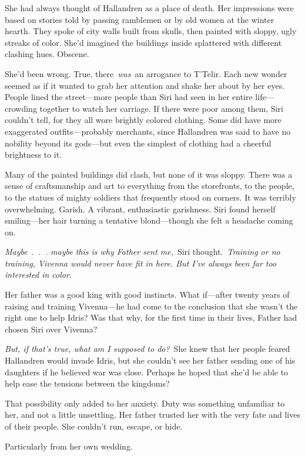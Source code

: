 She had always thought of Hallandren as a place of death. Her impressions were based on stories told by passing ramblemen or by old women at the winter hearth. They spoke of city walls built from skulls, then painted with sloppy, ugly streaks of color. She’d imagined the buildings inside splattered with different clashing hues. Obscene.

She’d been wrong. True, there~\textit{was}~an arrogance to T’Telir. Each new wonder seemed as if it wanted to grab her attention and shake her about by her eyes. People lined the street—more people than Siri had seen in her entire life—crowding together to watch her carriage. If there were poor among them, Siri couldn’t tell, for they all wore brightly colored clothing. Some did have more exaggerated outfits—probably merchants, since Hallandren was said to have no nobility beyond its gods—but even the simplest of clothing had a cheerful brightness to it.

Many of the painted buildings did clash, but none of it was sloppy. There was a sense of craftsmanship and art to everything from the storefronts, to the people, to the statues of mighty soldiers that frequently stood on corners. It was terribly overwhelming. Garish. A vibrant, enthusiastic garishness. Siri found herself smiling—her hair turning a tentative blond—though she felt a headache coming on.

\textit{Maybe~.~.~. maybe this is why Father sent me,}~Siri thought.~\textit{Training or no training, Vivenna would never have fit in here. But I’ve always been far too interested in color.}

Her father was a good king with good instincts. What if—after twenty years of raising and training Vivenna—he had come to the conclusion that she wasn’t the right one to help Idris? Was that why, for the first time in their lives, Father had chosen Siri over Vivenna?

\textit{But, if that’s true, what am I supposed to do?}~She knew that her people feared Hallandren would invade Idris, but she couldn’t see her father sending one of his daughters if he believed war was close. Perhaps he hoped that she’d be able to help ease the tensions between the kingdoms?

That possibility only added to her anxiety. Duty was something unfamiliar to her, and not a little unsettling. Her father trusted her with the very fate and lives of their people. She couldn’t run, escape, or hide.

Particularly from her own wedding.

